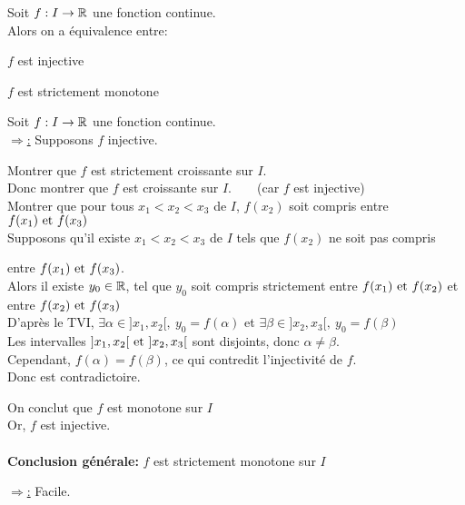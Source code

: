 \documentclass[12pt,twoside,a4paper]{article}
\begin{document}
		\newpage
		\begin{prop}
			Soit $f:I\rightarrow \mathbb{R}$ une fonction continue.\\
			Alors on a équivalence entre:
			\begin{liste}
				\item[\cercle1] $f$ est injective
				\item[\cercle2] $f$ est strictement monotone
			\end{liste}
		\end{prop}
		\begin{preuve}
			Soit $f:I\rightarrow \mathbb{R}$ une fonction continue.\\
			\underline{$\Rightarrow$:} Supposons $f$ injective.
			\begin{tab}
				Montrer que $f$ est strictement croissante sur $I$.\\
				Donc montrer que $f$ est croissante sur $I$.\ \ \ \ (car $f$ est injective)\\
				Montrer que pour tous $x_1<x_2<x_3$ de $I$, $f(x_2)$ soit compris entre $f(x_1)\text{ et } f(x_3)$\\
				 Supposons qu'il existe $x_1<x_2<x_3$ de $I$ tels que $f(x_2)$ ne soit pas compris
				\begin{tab}
					entre $f(x_1)\text{ et } f(x_3)$.\\
					Alors il existe $y_0\in\mathbb{R}$, tel que $y_0$ soit compris strictement entre $f(x_1) \text{ et } f(x_2)$ et entre $f(x_2) \text{ et } f(x_3)$\\
					D'après le TVI, $\exists \alpha\in]x_1,x_2[,\ y_0=f(\alpha)$ et $\exists \beta\in]x_2,x_3[,\ y_0=f(\beta)$\\
					Les intervalles $]x_1,x_2[\text{ et }]x_2,x_3[$ sont disjoints, donc $\alpha\neq\beta$.\\
					Cependant, $f(\alpha)=f(\beta)$, ce qui contredit l'injectivité de $f$.\\
					Donc  est contradictoire.
				\end{tab}
				On conclut que $f$ est monotone sur $I$\\
				Or, $f$ est injective.\\
				\\
				\textbf{Conclusion générale:} $f$ est strictement monotone sur $I$
			\end{tab}
			\underline{$\Rightarrow$:} Facile.
		\end{preuve}
\end{document}
